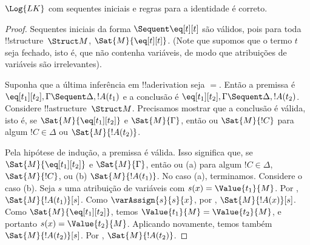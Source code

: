\documentclass[../../../include/open-logic-section]{subfiles}
\begin{document}


\begin{prop}
$\Log{LK}$ com sequentes iniciais e regras para a identidade é correto.
\end{prop}

\begin{proof}
Sequentes iniciais da forma ${} \Sequent \eq[t][t]$ são válidos, pois
para toda !!{structure}~$\Struct M$, $\Sat{M}{\eq[t][t]}$. (Note que
supomos que o termo $t$ seja fechado, isto é, que não contenha variáveis,
de modo que atribuições de variáveis são irrelevantes).

Suponha que a última inferência em !!a{derivation} seja $=$. Então a premissa
é $\eq[t_1][t_2], \Gamma \Sequent \Delta, !A(t_1)$ e a conclusão
é $\eq[t_1][t_2], \Gamma \Sequent \Delta, !A(t_2)$. Considere
!!a{structure}~$\Struct M$. Precisamos mostrar que a conclusão é
válida, isto é, se $\Sat{M}{\eq[t_1][t_2]}$ e $\Sat{M}{\Gamma}$, então
ou $\Sat{M}{!C}$ para algum $!C \in \Delta$ ou $\Sat{M}{!A(t_2)}$.

Pela hipótese de indução, a premissa é válida. Isso significa que, se
$\Sat{M}{\eq[t_1][t_2]}$ e $\Sat{M}{\Gamma}$, então ou (a) para algum $!C
\in \Delta$, $\Sat{M}{!C}$, ou (b) $\Sat{M}{!A(t_1)}$. No caso (a),
terminamos. Considere o caso (b).  Seja $s$ uma atribuição de variáveis com
$s(x) = \Value{t_1}{M}$.  Por ,
$\Sat{M}{!A(t_1)}[s]$. Como $\varAssign{s}{s}{x}$, por
, $\Sat{M}{!A(x)}[s]$. Como
$\Sat{M}{\eq[t_1][t_2]}$, temos $\Value{t_1}{M} = \Value{t_2}{M}$,
e portanto $s(x) = \Value{t_2}{M}$.  Aplicando
 novamente, temos também
$\Sat{M}{!A(t_2)}[s]$.  Por ,
$\Sat{M}{!A(t_2)}$.
\end{proof}
\end{document}
